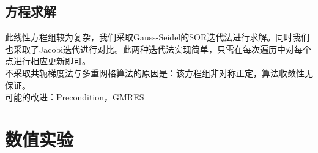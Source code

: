\documentclass[11pt,a4 paper,one side]{article}
\begin{document}
\subsection{方程求解}
此线性方程组较为复杂，我们采取Gauss-Seidel的SOR迭代法进行求解。同时我们也采取了Jacobi迭代进行对比。此两种迭代法实现简单，只需在每次遍历中对每个点进行相应更新即可。
\\ 不采取共轭梯度法与多重网格算法的原因是：该方程组非对称正定，算法收敛性无保证。
\\ 可能的改进：Precondition，GMRES
\section{数值实验}
\end{document}
